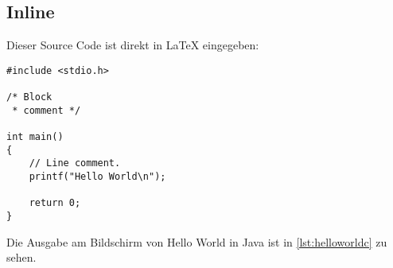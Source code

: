 \subsection{Inline}
Dieser Source Code ist direkt in \LaTeX{} eingegeben:
\begin{lstlisting}[caption=Hello World in C, label=lst:helloworldc]
#include <stdio.h>

/* Block
 * comment */
 
int main()
{
    // Line comment.
    printf("Hello World\n");
 
    return 0;
}
\end{lstlisting}
Die Ausgabe am Bildschirm von Hello World in Java ist in \ref{lst:helloworldc} zu sehen.